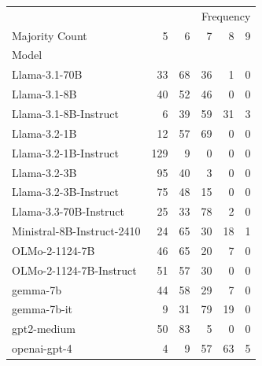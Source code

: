 \begin{tabular}{lrrrrr}
\toprule
 & \multicolumn{5}{r}{Frequency} \\
Majority Count & 5 & 6 & 7 & 8 & 9 \\
Model &  &  &  &  &  \\
\midrule
Llama-3.1-70B & 33 & 68 & 36 & 1 & 0 \\
Llama-3.1-8B & 40 & 52 & 46 & 0 & 0 \\
Llama-3.1-8B-Instruct & 6 & 39 & 59 & 31 & 3 \\
Llama-3.2-1B & 12 & 57 & 69 & 0 & 0 \\
Llama-3.2-1B-Instruct & 129 & 9 & 0 & 0 & 0 \\
Llama-3.2-3B & 95 & 40 & 3 & 0 & 0 \\
Llama-3.2-3B-Instruct & 75 & 48 & 15 & 0 & 0 \\
Llama-3.3-70B-Instruct & 25 & 33 & 78 & 2 & 0 \\
Ministral-8B-Instruct-2410 & 24 & 65 & 30 & 18 & 1 \\
OLMo-2-1124-7B & 46 & 65 & 20 & 7 & 0 \\
OLMo-2-1124-7B-Instruct & 51 & 57 & 30 & 0 & 0 \\
gemma-7b & 44 & 58 & 29 & 7 & 0 \\
gemma-7b-it & 9 & 31 & 79 & 19 & 0 \\
gpt2-medium & 50 & 83 & 5 & 0 & 0 \\
openai-gpt-4 & 4 & 9 & 57 & 63 & 5 \\
\bottomrule
\end{tabular}
